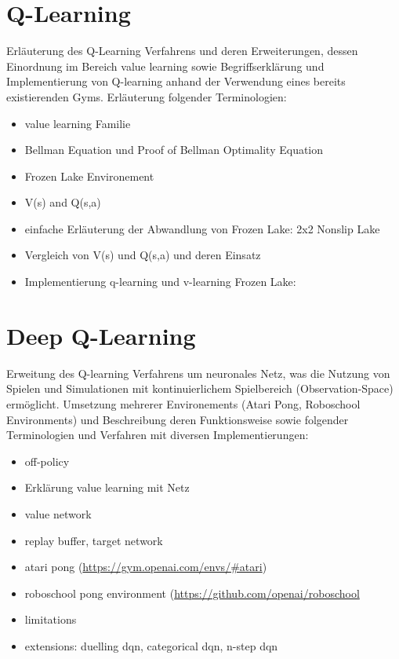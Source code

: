 \documentclass[11pt]{scrartcl}
\begin{document}
\section{Q-Learning}
Erläuterung des Q-Learning Verfahrens und deren Erweiterungen, dessen Einordnung im
Bereich value learning sowie Begriffserklärung und Implementierung von Q-learning anhand
der Verwendung eines bereits existierenden Gyms. Erläuterung folgender Terminologien:


\begin{itemize}
\itemsep0pt
\item value learning Familie
\item Bellman Equation und Proof of Bellman Optimality Equation 
\item Frozen Lake Environement
\item V(s) and Q(s,a)
\item einfache Erläuterung der Abwandlung von Frozen Lake: 2x2 Nonslip Lake
\item Vergleich von V(s) und Q(s,a) und deren Einsatz
\item Implementierung q-learning und v-learning Frozen Lake:
\end{itemize}

\section{Deep Q-Learning}
Erweitung des Q-learning Verfahrens um neuronales Netz, was die Nutzung von Spielen und
Simulationen mit kontinuierlichem Spielbereich (Observation-Space) ermöglicht. Umsetzung
mehrerer Environements (Atari Pong, Roboschool Environments) und Beschreibung deren
Funktionsweise sowie folgender Terminologien und Verfahren mit diversen Implementierungen:

\begin{itemize}
\itemsep0pt
\item off-policy
\item Erklärung value learning mit Netz
\item value network
\item replay buffer, target network
\item atari pong (\url{https://gym.openai.com/envs/#atari})
\item roboschool pong environment (\url{https://github.com/openai/roboschool}
\item limitations
\item extensions: duelling dqn, categorical dqn, n-step dqn
\end{itemize}
\end{document}
